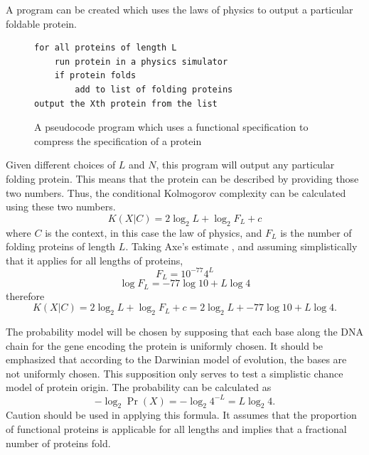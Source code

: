 A program can be created which uses the laws of physics to output a particular foldable protein.
\begin{figure}[H]
\begin{mdframed}
\begin{verbatim}
for all proteins of length L
    run protein in a physics simulator
    if protein folds
        add to list of folding proteins
output the Xth protein from the list
\end{verbatim}
\end{mdframed}
\caption{A pseudocode program which uses a functional specification to compress the specification of a protein}
\end{figure}

Given different choices of $L$ and $N$, this program will output any particular folding protein.
This means that the protein can be described by providing those two numbers.  Thus, the conditional Kolmogorov complexity can be calculated using these two numbers.
\begin{equation}
    K(X|C) = 2 \log_2 L + \log_2 F_L + c
\end{equation} where $C$ is the context, in this case the law of physics,
and $F_L$ is the number of folding proteins of length $L$.
Taking Axe's estimate \citep{axe2004}, and assuming simplistically that it applies for all lengths of proteins,
\begin{equation}
    F_L = 10^{-77} 4^L 
\end{equation}
\begin{equation}
    \log F_L = -77 \log 10 + L \log 4
\end{equation}
therefore
\begin{equation}
    K(X|C) = 2 \log_2 L + \log_2 F_L + c = 2 \log_2 L + -77 \log 10  + L \log 4 \mbox{.}
\end{equation}

The probability model will be chosen by supposing that each base along the DNA chain for the gene encoding the protein is uniformly chosen.
It should be emphasized that according to the Darwinian model of evolution, the bases are not uniformly chosen.
This supposition only serves to test a simplistic chance model of protein origin.
The probability can be calculated as
\begin{equation}
    -\log_2 \Pr(X) =  -\log_2 4^{-L} = L \log_2 4 \mbox{.}
\end{equation}
Caution should be used in applying this formula.
It assumes that the proportion of functional proteins is applicable for all lengths and implies that a fractional number of proteins fold.

